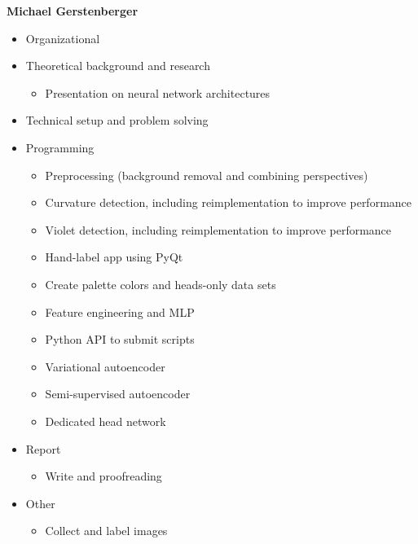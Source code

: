 \bigskip
\textbf{Michael Gerstenberger}
\begin{itemize}
	\item Organizational
	\item Theoretical background and research
	\begin{itemize}
		\item Presentation on neural network architectures
	\end{itemize}
	\item Technical setup and problem solving
	\item Programming
	\begin{itemize}
		\item Preprocessing (background removal and combining perspectives)
		\item Curvature detection, including reimplementation to improve performance
		\item Violet detection, including reimplementation to improve performance
		\item Hand-label app using PyQt
		\item Create palette colors and heads-only data sets
		\item Feature engineering and MLP
		\item Python API to submit scripts
		\item Variational autoencoder
		\item Semi-supervised autoencoder
		\item Dedicated head network
	\end{itemize}
	\item Report
	\begin{itemize}
		\item Write and proofreading
	\end{itemize}
	\item Other
	\begin{itemize}
		\item Collect and label images
	\end{itemize}
\end{itemize} 

